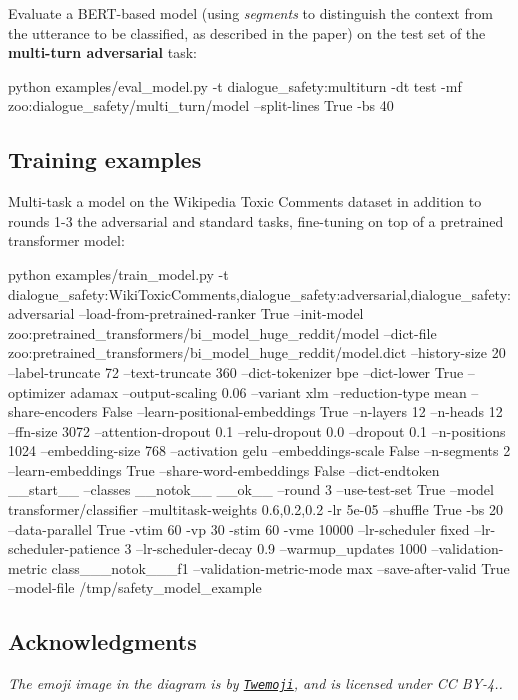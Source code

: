 Evaluate a B\+E\+R\+T-\/based model (using {\itshape segments} to distinguish the context from the utterance to be classified, as described in the paper) on the test set of the {\bfseries multi-\/turn adversarial} task\+: 
\begin{DoxyCode}
python examples/eval\_model.py -t dialogue\_safety:multiturn -dt test -mf
       zoo:dialogue\_safety/multi\_turn/model --split-lines True -bs 40
\end{DoxyCode}


\subsection*{Training examples}

Multi-\/task a model on the Wikipedia Toxic Comments dataset in addition to rounds 1-\/3 the adversarial and standard tasks, fine-\/tuning on top of a pretrained transformer model\+: 
\begin{DoxyCode}
python examples/train\_model.py -t
       dialogue\_safety:WikiToxicComments,dialogue\_safety:adversarial,dialogue\_safety:adversarial --load-from-pretrained-ranker True --init-model
       zoo:pretrained\_transformers/bi\_model\_huge\_reddit/model --dict-file zoo:pretrained\_transformers/bi\_model\_huge\_reddit/model.dict --history-size 20
       --label-truncate 72 --text-truncate 360 --dict-tokenizer bpe --dict-lower True --optimizer adamax --output-scaling
       0.06 --variant xlm --reduction-type mean --share-encoders False --learn-positional-embeddings True
       --n-layers 12 --n-heads 12 --ffn-size 3072 --attention-dropout 0.1 --relu-dropout 0.0 --dropout 0.1 --n-positions
       1024 --embedding-size 768 --activation gelu  --embeddings-scale False --n-segments 2 --learn-embeddings True
       --share-word-embeddings False --dict-endtoken \_\_start\_\_ --classes \_\_notok\_\_ \_\_ok\_\_ --round 3 --use-test-set
       True --model transformer/classifier --multitask-weights 0.6,0.2,0.2 -lr 5e-05 --shuffle True -bs 20
       --data-parallel True -vtim 60 -vp 30 -stim 60 -vme 10000 --lr-scheduler fixed --lr-scheduler-patience 3
       --lr-scheduler-decay 0.9 --warmup\_updates 1000 --validation-metric class\_\_\_notok\_\_\_f1 --validation-metric-mode max
       --save-after-valid True --model-file /tmp/safety\_model\_example
\end{DoxyCode}


\subsection*{Acknowledgments}

{\itshape The emoji image in the diagram is by \href{https://github.com/twitter/twemoji}{\tt Twemoji}, and is licensed under CC B\+Y-\/4..} 